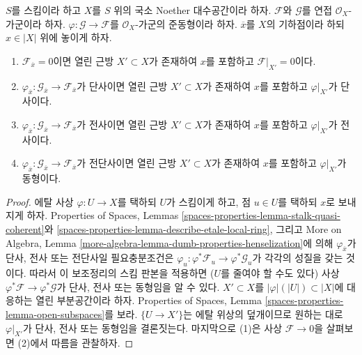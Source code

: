 \begin{lemma}
\label{lemma-local-isomorphism}
$S$를 스킴이라 하고 $X$를 $S$ 위의 국소 Noether 대수공간이라 하자.
$\mathcal{F}$와 $\mathcal{G}$를 연접 $\mathcal{O}_X$-가군이라 하자.
$\varphi : \mathcal{G} \to \mathcal{F}$를 $\mathcal{O}_X$-가군의
준동형이라 하자. $\overline{x}$를 $X$의 기하점이라 하되
$x \in |X|$ 위에 놓이게 하자.
\begin{enumerate}
\item $\mathcal{F}_{\overline{x}} = 0$이면 열린 근방
$X' \subset X$가 존재하여 $x$를 포함하고 $\mathcal{F}|_{X'} = 0$이다.
\item $\varphi_{\overline{x}} : \mathcal{G}_{\overline{x}} \to
\mathcal{F}_{\overline{x}}$가 단사이면 열린 근방
$X' \subset X$가 존재하여 $x$를 포함하고 $\varphi|_{X'}$가 단사이다.
\item $\varphi_{\overline{x}} : \mathcal{G}_{\overline{x}} \to
\mathcal{F}_{\overline{x}}$가 전사이면 열린 근방
$X' \subset X$가 존재하여 $x$를 포함하고 $\varphi|_{X'}$가 전사이다.
\item $\varphi_{\overline{x}} : \mathcal{G}_{\overline{x}} \to
\mathcal{F}_{\overline{x}}$가 전단사이면 열린 근방
$X' \subset X$가 존재하여 $x$를 포함하고 $\varphi|_{X'}$가 동형이다.
\end{enumerate}
\end{lemma}

\begin{proof}
에탈 사상 $\varphi : U \to X$를 택하되 $U$가 스킴이게 하고,
점 $u \in U$를 택하되 $x$로 보내지게 하자. Properties of Spaces, Lemmas
\ref{spaces-properties-lemma-stalk-quasi-coherent}와
\ref{spaces-properties-lemma-describe-etale-local-ring}, 그리고 More on Algebra,
Lemma \ref{more-algebra-lemma-dumb-properties-henselization}에 의해
$\varphi_{\overline{x}}$가 단사, 전사 또는 전단사일 필요충분조건은
$\varphi_u : \varphi^*\mathcal{F}_u \to \varphi^*\mathcal{G}_u$가
각각의 성질을 갖는 것이다. 따라서 이 보조정리의 스킴 판본을 적용하면
($U$를 줄여야 할 수도 있다) 사상
$\varphi^*\mathcal{F} \to \varphi^*\mathcal{G}$가 단사, 전사 또는
동형임을 알 수 있다. $X' \subset X$를
$|\varphi|(|U|) \subset |X|$에 대응하는 열린 부분공간이라 하자.
Properties of Spaces, Lemma \ref{spaces-properties-lemma-open-subspaces}를
보라. $\{U \to X'\}$는 에탈 위상의 덮개이므로 원하는 대로
$\varphi|_{X'}$가 단사, 전사 또는 동형임을 결론짓는다. 마지막으로
(1)은 사상 $\mathcal{F} \to 0$을 살펴보면 (2)에서 따름을 관찰하자.
\end{proof}

